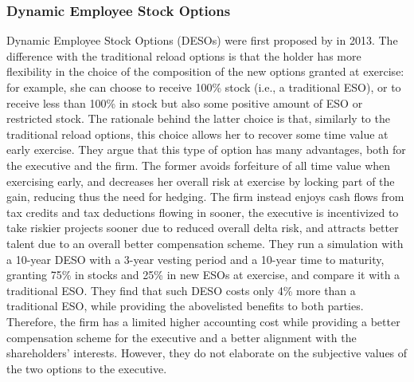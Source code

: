 \subsubsection{Dynamic Employee Stock Options}
    Dynamic Employee Stock Options (DESOs) were first proposed by \citet{huang2013dynamic} in 2013. The difference with the traditional reload options is that the holder has more flexibility in the choice of the composition of the new options granted at exercise: for example, she can choose to receive 100\% stock (i.e., a traditional ESO), or to receive less than 100\% in stock but also some positive amount of ESO or restricted stock. The rationale behind the latter choice is that, similarly to the traditional reload options, this choice allows her to recover some time value at early exercise. They argue that this type of option has many advantages, both for the executive and the firm. The former avoids forfeiture of all time value when exercising early, and decreases her overall risk at exercise by locking part of the gain, reducing thus the need for hedging. The firm instead enjoys cash flows from tax credits and tax deductions flowing in sooner, the executive is incentivized to take riskier projects sooner due to reduced overall delta risk, and attracts better talent due to an overall better compensation scheme. 
    They run a simulation with a 10-year DESO with a 3-year vesting period and a 10-year time to maturity, granting 75\% in stocks and 25\% in new ESOs at exercise, and compare it with a traditional ESO. They find that such DESO costs only 4\% more than a traditional ESO, while providing the abovelisted benefits to both parties. Therefore, the firm has a limited higher accounting cost while providing a better compensation scheme for the executive and a better alignment with the shareholders' interests. However, they do not elaborate on the subjective values of the two options to the executive.

